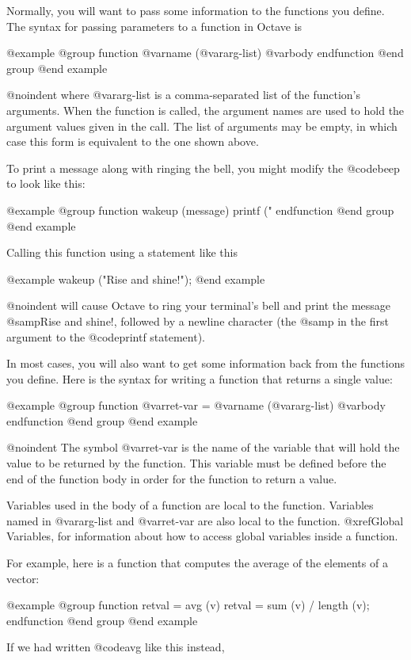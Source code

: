 Normally, you will want to pass some information to the functions you
define.  The syntax for passing parameters to a function in Octave is

@example
@group
function @var{name} (@var{arg-list})
  @var{body}
endfunction
@end group
@end example

@noindent
where @var{arg-list} is a comma-separated list of the function's
arguments.  When the function is called, the argument names are used to
hold the argument values given in the call.  The list of arguments may
be empty, in which case this form is equivalent to the one shown above.

To print a message along with ringing the bell, you might modify the
@code{beep} to look like this:

@example
@group
function wakeup (message)
  printf ("\a%
endfunction
@end group
@end example

Calling this function using a statement like this

@example
wakeup ("Rise and shine!");
@end example

@noindent
will cause Octave to ring your terminal's bell and print the message
@samp{Rise and shine!}, followed by a newline character (the @samp{\n}
in the first argument to the @code{printf} statement).

In most cases, you will also want to get some information back from the
functions you define.  Here is the syntax for writing a function that
returns a single value:

@example
@group
function @var{ret-var} = @var{name} (@var{arg-list})
  @var{body}
endfunction
@end group
@end example

@noindent
The symbol @var{ret-var} is the name of the variable that will hold the
value to be returned by the function.  This variable must be defined
before the end of the function body in order for the function to return
a value.

Variables used in the body of a function are local to the
function.  Variables named in @var{arg-list} and @var{ret-var} are also
local to the function.  @xref{Global Variables}, for information about
how to access global variables inside a function.

For example, here is a function that computes the average of the
elements of a vector:

@example
@group
function retval = avg (v)
  retval = sum (v) / length (v);
endfunction
@end group
@end example

If we had written @code{avg} like this instead,


